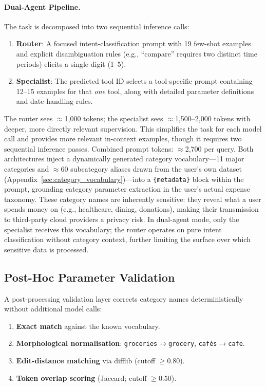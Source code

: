 \documentclass[11pt,twocolumn]{article}
\begin{document}
\paragraph{Dual-Agent Pipeline.}
The task is decomposed into two sequential inference calls:
\begin{enumerate}
    \item \textbf{Router}: A focused intent-classification prompt
          with 19 few-shot examples and explicit disambiguation rules
          (e.g., ``compare'' requires two distinct time periods) elicits
          a single digit (1--5).
    \item \textbf{Specialist}: The predicted tool ID selects a
          tool-specific prompt containing 12--15 examples for that
          \emph{one} tool, along with detailed parameter definitions
          and date-handling rules.
\end{enumerate}
The router sees $\approx$1,000 tokens; the specialist sees
$\approx$1,500--2,000 tokens with deeper, more directly relevant
supervision.
This simplifies the task for each model call and provides more
relevant in-context examples, though it requires two sequential
inference passes.
Combined prompt tokens: $\approx$2,700 per query.
Both architectures inject a dynamically generated category
vocabulary---11 major categories and $\approx$60 subcategory
aliases drawn from the user's own dataset
(Appendix~\ref{sec:category_vocabulary})---into a
\texttt{\{metadata\}} block within the prompt, grounding category
parameter extraction in the user's actual expense taxonomy.
These category names are inherently sensitive: they reveal what
a user spends money on (e.g., healthcare, dining, donations),
making their transmission to third-party cloud providers a
privacy risk.
In dual-agent mode, only the specialist receives this vocabulary;
the router operates on pure intent classification without category
context, further limiting the surface over which sensitive data is
processed.

\subsection{Post-Hoc Parameter Validation}
\label{sec:validation}

A post-processing validation layer corrects category names
deterministically without additional model calls:

\begin{enumerate}
    \item \textbf{Exact match} against the known vocabulary.
    \item \textbf{Morphological normalisation}:
          \texttt{groceries}$\to$\texttt{grocery},
          \texttt{caf\'{e}s}$\to$\texttt{cafe}.
    \item \textbf{Edit-distance matching} via difflib
          (cutoff $\geq 0.80$).
    \item \textbf{Token overlap scoring} (Jaccard;
          cutoff $\geq 0.50$).
\end{enumerate}
\end{document}

